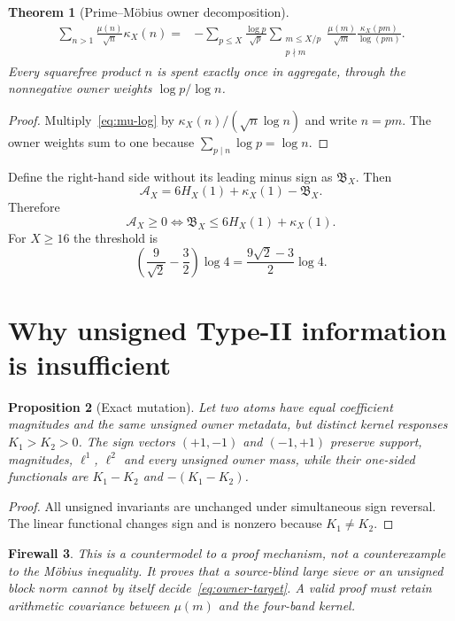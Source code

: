 \documentclass[11pt]{article}
\newtheorem{theorem}{Theorem}[section]
\newtheorem{proposition}[theorem]{Proposition}
\newtheorem{firewall}[theorem]{Firewall}
\newcommand{\Acal}{\mathcal A}
\newcommand{\Bcal}{\mathfrak B}
\begin{document}
\begin{theorem}[Prime--M\"obius owner decomposition]\label{thm:owner}
\begin{align}
 \sum_{n>1}\frac{\mu(n)}{\sqrt n}\kappa_X(n)
 ={}&-\sum_{p\le X}\frac{\log p}{\sqrt p}
 \sum_{\substack{m\le X/p\\p\nmid m}}
 \frac{\mu(m)}{\sqrt m}
 \frac{\kappa_X(pm)}{\log(pm)}.
 \label{eq:owner}
\end{align}
Every squarefree product $n$ is spent exactly once in aggregate, through the
nonnegative owner weights $\log p/\log n$.
\end{theorem}
\begin{proof}
Multiply~\eqref{eq:mu-log} by
$\kappa_X(n)/(\sqrt n\log n)$ and write $n=pm$.  The owner weights sum to one
because $\sum_{p\mid n}\log p=\log n$.
\end{proof}

Define the right-hand side without its leading minus sign as $\Bcal_X$.  Then
\[
 \Acal_X=6H_X(1)+\kappa_X(1)-\Bcal_X.
\]
Therefore
\begin{equation}\label{eq:owner-target}
 \Acal_X\ge0
 \Longleftrightarrow
 \Bcal_X\le6H_X(1)+\kappa_X(1).
\end{equation}
For $X\ge16$ the threshold is
\[
 \left(\frac9{\sqrt2}-\frac32\right)\log4
 =\frac{9\sqrt2-3}{2}\log4.
\]

\section{Why unsigned Type-II information is insufficient}
\begin{proposition}[Exact mutation]\label{prop:mutation}
Let two atoms have equal coefficient magnitudes and the same unsigned owner
metadata, but distinct kernel responses $K_1>K_2>0$.  The sign vectors
$(+1,-1)$ and $(-1,+1)$ preserve support, magnitudes, $\ell^1$, $\ell^2$ and
every unsigned owner mass, while their one-sided functionals are
$K_1-K_2$ and $-(K_1-K_2)$.
\end{proposition}

\begin{proof}
All unsigned invariants are unchanged under simultaneous sign reversal.  The
linear functional changes sign and is nonzero because $K_1\ne K_2$.
\end{proof}

\begin{firewall}
This is a countermodel to a proof mechanism, not a counterexample to the
M\"obius inequality.  It proves that a source-blind large sieve or an unsigned
block norm cannot by itself decide~\eqref{eq:owner-target}.  A valid proof must
retain arithmetic covariance between $\mu(m)$ and the four-band kernel.
\end{firewall}
\end{document}
